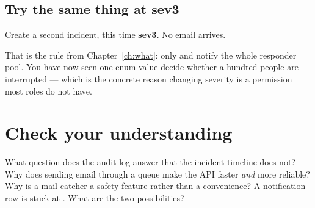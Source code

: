 

\subsection{Try the same thing at sev3}

Create a second incident, this time \textbf{sev3}. No email arrives.

That is the rule from Chapter~\ref{ch:what}: only  and 
notify the whole responder pool. You have now seen one enum value decide whether
a hundred people are interrupted --- which is the concrete reason changing
severity is a permission most roles do not have.

\section{Check your understanding}

\begin{itemize}[leftmargin=1.4cm]
\cbox What question does the audit log answer that the incident timeline does
  not?
\cbox Why does sending email through a queue make the API faster \emph{and}
  more reliable?
\cbox Why is a mail catcher a safety feature rather than a convenience?
\cbox A notification row is stuck at . What are the two
  possibilities?
\end{itemize}
